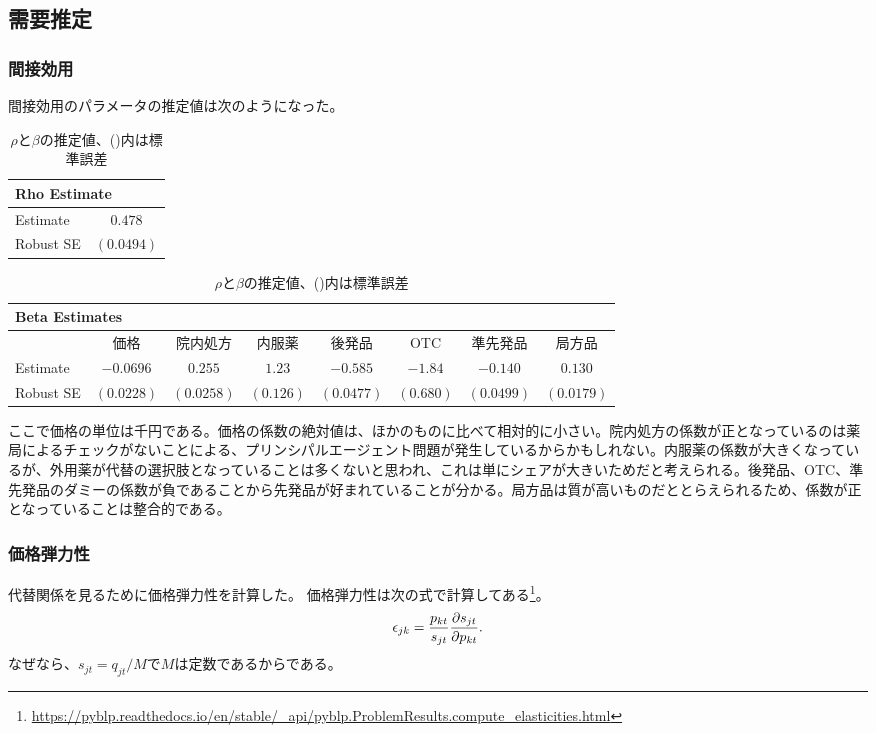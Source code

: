 \documentclass[a4paper,11pt,uplatex]{jsarticle}
\theoremstyle{definition}
\begin{document}
\subsection{需要推定}
\subsubsection{間接効用}
間接効用のパラメータの推定値は次のようになった。
\begin{table}[H]
    \centering
    \footnotesize
    \caption{\(\rho\)と\(\beta\)の推定値、()内は標準誤差}
    \begin{tabular}{l c}
        \toprule
        \multicolumn{2}{l}{Rho Estimate} \\
        \midrule
        Estimate & $0.478$\\
        Robust SE & $(0.0494)$ \\
        \bottomrule
    \end{tabular}

    \vspace{1em}
    \footnotesize
    \begin{tabular}{lccccccc}
        \toprule
        \multicolumn{8}{l}{Beta Estimates} \\
        \midrule
        & 価格 & 院内処方 & 内服薬 & 後発品 & OTC & 準先発品 & 局方品 \\
        \midrule
        Estimate & $-0.0696$ & $0.255$ & $1.23$ & $-0.585 $ & $-1.84 $ & $-0.140 $ & $0.130 $ \\
        Robust SE & $(0.0228 )$ & $(0.0258 )$ & $(0.126 )$ & $(0.0477)$ & $(0.680)$ & $(0.0499 )$ & $(0.0179 )$ \\
        \bottomrule
    \end{tabular}
\end{table}
ここで価格の単位は千円である。価格の係数の絶対値は、ほかのものに比べて相対的に小さい。院内処方の係数が正となっているのは薬局によるチェックがないことによる、プリンシパルエージェント問題が発生しているからかもしれない。内服薬の係数が大きくなっているが、外用薬が代替の選択肢となっていることは多くないと思われ、これは単にシェアが大きいためだと考えられる。後発品、OTC、準先発品のダミーの係数が負であることから先発品が好まれていることが分かる。局方品は質が高いものだととらえられるため、係数が正となっていることは整合的である。
\subsubsection{価格弾力性}
代替関係を見るために価格弾力性を計算した。
価格弾力性は次の式で計算してある\footnote{\url{https://pyblp.readthedocs.io/en/stable/_api/pyblp.ProblemResults.compute_elasticities.html}}。
\begin{align*}
\epsilon_{jk}=\frac{p_{kt}}{s_{jt}} \pdv{s_{jt}}{p_{kt}}.
\end{align*}
なぜなら、\(s_{jt}=q_{jt}/M\)で\(M\)は定数であるからである。
\end{document}
